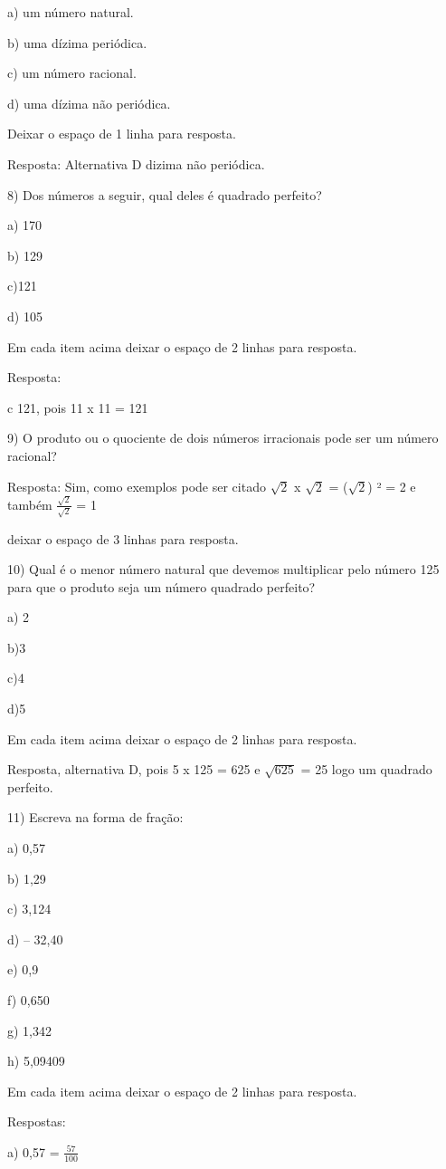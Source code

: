 {a) um número natural.

b) uma dízima periódica.

c) um número racional.

d) uma dízima não periódica.

Deixar o espaço de 1 linha para resposta.

Resposta: Alternativa D dizima não periódica.

8) Dos números a seguir, qual deles é quadrado perfeito?

a) 170

b) 129

c)121

d) 105

Em cada item acima deixar o espaço de 2 linhas para resposta.

Resposta:

c 121, pois 11 x 11 = 121

9) O produto ou o quociente de dois números irracionais pode ser um
número racional?

Resposta: Sim, como exemplos pode ser citado \(\sqrt{2}\) x \(\sqrt{2}\)
= (\(\sqrt{2}\)) ² = 2 e também \(\frac{\sqrt{2}}{\sqrt{2}}\) = 1

deixar o espaço de 3 linhas para resposta.

10) Qual é o menor número natural que devemos multiplicar pelo número
125 para que o produto seja um número quadrado perfeito?

a) 2

b)3

c)4

d)5

Em cada item acima deixar o espaço de 2 linhas para resposta.

Resposta, alternativa D, pois 5 x 125 = 625 e \(\sqrt{625}\) = 25 logo
um quadrado perfeito.

11) Escreva na forma de fração:

a) 0,57

b) 1,29

c) 3,124

d) -- 32,40

e) 0,9

f) 0,650

g) 1,342

h) 5,09409

Em cada item acima deixar o espaço de 2 linhas para resposta.

Respostas:

a) 0,57 = \(\frac{57}{100}\)

}
